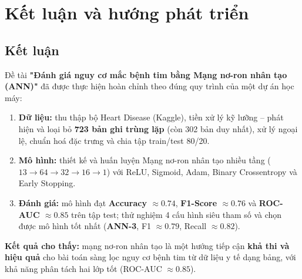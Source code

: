 
\chapter{Kết luận và hướng phát triển}
\label{chap:conclusion}

\section{Kết luận}
Đề tài \textbf{"Đánh giá nguy cơ mắc bệnh tim bằng Mạng nơ-ron nhân tạo (ANN)"}
đã được thực hiện hoàn chỉnh theo đúng quy trình của một dự án học máy:
\begin{enumerate}
  \item \textbf{Dữ liệu:} thu thập bộ Heart Disease (Kaggle), tiền xử lý kỹ
        lưỡng -- phát hiện và loại bỏ \textbf{723 bản ghi trùng lặp} (còn 302
        bản duy nhất), xử lý ngoại lệ, chuẩn hoá đặc trưng và chia tập
        train/test 80/20.
  \item \textbf{Mô hình:} thiết kế và huấn luyện Mạng nơ-ron nhân tạo nhiều tầng
        ($13 \to 64 \to 32 \to 16 \to 1$) với ReLU, Sigmoid, Adam, Binary
        Crossentropy và Early Stopping.
  \item \textbf{Đánh giá:} mô hình đạt \textbf{Accuracy $\approx 0.74$},
        \textbf{F1-Score $\approx 0.76$} và \textbf{ROC-AUC $\approx 0.85$} trên
        tập test; thử nghiệm 4 cấu hình siêu tham số và chọn được mô hình tốt
        nhất (\textbf{ANN-3}, F1 $\approx 0.79$, Recall $\approx 0.82$).
\end{enumerate}

\textbf{Kết quả cho thấy:} mạng nơ-ron nhân tạo là một hướng tiếp cận
\textbf{khả thi và hiệu quả} cho bài toán sàng lọc nguy cơ bệnh tim từ dữ liệu
y tế dạng bảng, với khả năng phân tách hai lớp tốt (ROC-AUC $\approx 0.85$).

